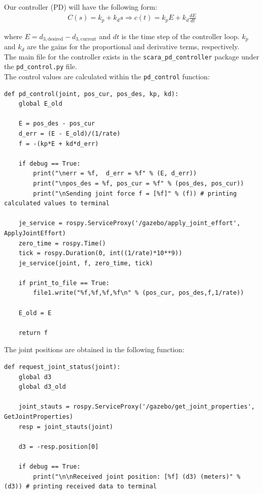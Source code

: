 \documentclass[10pt]{article}
\begin{document}
\begin{enumerate}
	Our controller (PD) will have the following form:
	\begin{align*}
		C(s) = k_p + k_d s \Rightarrow c(t) = k_p E + k_d \frac{dE}{dt}
	\end{align*}
	
	where $E = d_{3,\text{desired}} - d_{3,\text{current}}$ and $dt$ is the time step of the controller loop. $k_p$ and $k_d$ are the gains for the proportional and derivative terms, respectively.
	\\
	
	The main file for the controller exists in the \texttt{scara\_pd\_controller} package under the \texttt{pd\_control.py} file.
	\\
	
	The control values are calculated within the \texttt{pd\_control} function:
	
\begin{lstlisting}[style=Matlab-editor,basicstyle=\mlttfamily,escapechar=`]
def pd_control(joint, pos_cur, pos_des, kp, kd):
	global E_old
	
	E = pos_des - pos_cur
	d_err = (E - E_old)/(1/rate)
	f = -(kp*E + kd*d_err)
	
	if debug == True:
		print("\nerr = %f,  d_err = %f" % (E, d_err))
		print("\npos_des = %f, pos_cur = %f" % (pos_des, pos_cur))
		print("\nSending joint force f = [%f]" % (f)) # printing calculated values to terminal
	
	je_service = rospy.ServiceProxy('/gazebo/apply_joint_effort', ApplyJointEffort)
	zero_time = rospy.Time()
	tick = rospy.Duration(0, int((1/rate)*10**9))
	je_service(joint, f, zero_time, tick)
	
	if print_to_file == True:
		file1.write("%f,%f,%f,%f\n" % (pos_cur, pos_des,f,1/rate))
	
	E_old = E 
	
	return f
\end{lstlisting} 

	The joint positions are obtained in the following function:
	
\begin{lstlisting}[style=Matlab-editor,basicstyle=\mlttfamily,escapechar=`]
def request_joint_status(joint):
	global d3
	global d3_old
	
	joint_stauts = rospy.ServiceProxy('/gazebo/get_joint_properties', GetJointProperties)
	resp = joint_stauts(joint)
	
	d3 = -resp.position[0]
	
	if debug == True:
		print("\n\nReceived joint position: [%f] (d3) (meters)" % (d3)) # printing received data to terminal
	

\end{lstlisting}
\end{enumerate}
\end{document}
